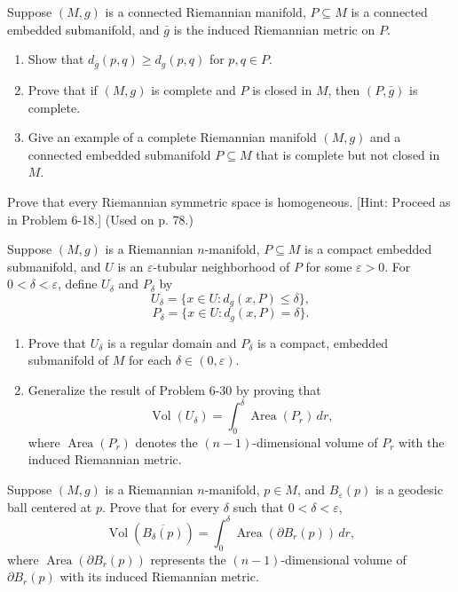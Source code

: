 \begin{exercise}
\label{prob:submanifold-distance-inequality}

Suppose $(M, g)$ is a connected Riemannian manifold, $P \subseteq M$ is a connected embedded submanifold, and $\bar{g}$ is the induced Riemannian metric on $P$.
\begin{enumerate}
\item[(a)] Show that $d_{\bar{g}}(p, q) \geq d_g(p, q)$ for $p, q \in P$.
\item[(b)] Prove that if $(M, g)$ is complete and $P$ is closed in $M$, then $(P, \bar{g})$ is complete.
\item[(c)] Give an example of a complete Riemannian manifold $(M, g)$ and a connected embedded submanifold $P \subseteq M$ that is complete but not closed in $M$.
\end{enumerate}
\end{exercise}

\begin{exercise}
\label{prob:symmetric-space-homogeneous}

Prove that every Riemannian symmetric space is homogeneous. [Hint: Proceed as in Problem 6-18.] (Used on p. 78.)
\end{exercise}

\begin{exercise}
\label{prob:tubular-neighborhood-volume}

Suppose $(M, g)$ is a Riemannian $n$-manifold, $P \subseteq M$ is a compact embedded submanifold, and $U$ is an $\varepsilon$-tubular neighborhood of $P$ for some $\varepsilon > 0$. For $0 < \delta < \varepsilon$, define $U_\delta$ and $P_\delta$ by
\[
U_\delta = \{x \in U : d_g(x, P) \leq \delta\},
\]
\[
P_\delta = \{x \in U : d_g(x, P) = \delta\}.
\]
\begin{enumerate}
\item[(a)] Prove that $U_\delta$ is a regular domain and $P_\delta$ is a compact, embedded submanifold of $M$ for each $\delta \in (0, \varepsilon)$.
\item[(b)] Generalize the result of Problem 6-30 by proving that
\[
\operatorname{Vol}(U_\delta) = \int_0^\delta \operatorname{Area}(P_r) \, dr,
\]
where $\operatorname{Area}(P_r)$ denotes the $(n-1)$-dimensional volume of $P_r$ with the induced Riemannian metric.
\end{enumerate}
\end{exercise}

\begin{exercise}
\label{prob:volume-geodesic-ball}

Suppose $(M, g)$ is a Riemannian $n$-manifold, $p \in M$, and $B_\varepsilon(p)$ is a geodesic ball centered at $p$. Prove that for every $\delta$ such that $0 < \delta < \varepsilon$,
\[
\operatorname{Vol}\left(\overline{B_\delta(p)}\right) = \int_0^\delta \operatorname{Area}(\partial B_r(p)) \, dr,
\]
where $\operatorname{Area}(\partial B_r(p))$ represents the $(n-1)$-dimensional volume of $\partial B_r(p)$ with its induced Riemannian metric.
\end{exercise}
